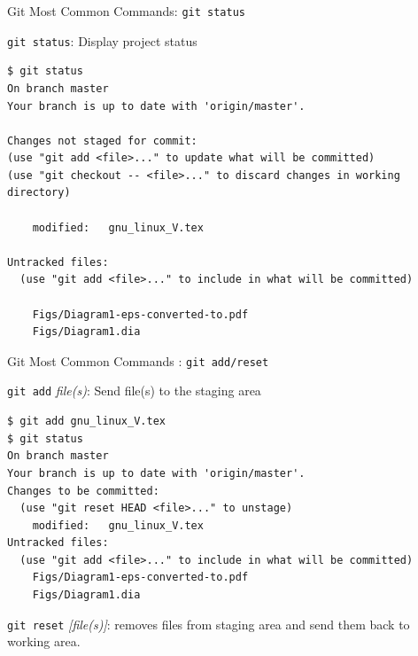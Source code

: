 \begin{frame}[t,fragile]{Git Most Common Commands: \alert{\texttt{git status}}}
      \begin{block}{\alert{\texttt{git status}}: Display project status}
          {\scriptsize 
          \begin{lstlisting}
$ git status
On branch master
Your branch is up to date with 'origin/master'.

Changes not staged for commit:
(use "git add <file>..." to update what will be committed)
(use "git checkout -- <file>..." to discard changes in working directory)

	modified:   gnu_linux_V.tex

Untracked files:
  (use "git add <file>..." to include in what will be committed)

	Figs/Diagram1-eps-converted-to.pdf
	Figs/Diagram1.dia

\end{lstlisting}
}      
\end{block}  
  
\end{frame}
\begin{frame}[t,fragile]{Git Most Common Commands : \alert{\texttt{git add/reset}}}
      \begin{block}{\alert{\texttt{git add} \emph{file(s)}}: Send file(s) to the \alert{staging} area}
          {\scriptsize 
          \begin{lstlisting}
$ git add gnu_linux_V.tex 
$ git status
On branch master
Your branch is up to date with 'origin/master'.
Changes to be committed:
  (use "git reset HEAD <file>..." to unstage)
	modified:   gnu_linux_V.tex
Untracked files:
  (use "git add <file>..." to include in what will be committed)
	Figs/Diagram1-eps-converted-to.pdf
	Figs/Diagram1.dia
\end{lstlisting}
%
}
\alert{\texttt{git reset} \emph{[file(s)]}}: removes files from staging area and send them back to working area.

\end{block}  
  
\end{frame}
